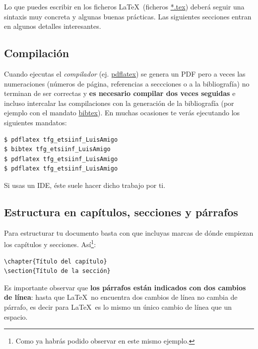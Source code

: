 Lo que puedes escribir en los ficheros \LaTeX\ (ficheros \url{*.tex})
deberá seguir una sintaxis muy concreta y algunas buenas
prácticas. Las siguientes secciones entran en algunos detalles
interesantes.

\subsection{Compilación}

Cuando ejecutas el \emph{compilador} (ej. \url{pdflatex}) se genera un
PDF pero a veces las numeraciones (números de página, referencias a
seccciones o a la bibliografía) no terminan de ser correctas y
\textbf{es necesario compilar dos veces seguidas} e incluso intercalar
las compilaciones con la generación de la bibliografía (por ejemplo
con el mandato \url{bibtex}). En muchas ocasiones te verás ejecutando
los siguientes mandatos:

\begin{verbatim}
$ pdflatex tfg_etsiinf_LuisAmigo
$ bibtex tfg_etsiinf_LuisAmigo
$ pdflatex tfg_etsiinf_LuisAmigo
$ pdflatex tfg_etsiinf_LuisAmigo
\end{verbatim}

Si usas un IDE, éste suele hacer dicho trabajo por ti.

\subsection{Estructura en capítulos, secciones y párrafos}

Para estructurar tu documento basta con que incluyas marcas de dónde
empiezan los capítulos y secciones. Así\footnote{Como ya habrás podido
  observar en este mismo ejemplo.}:

\begin{verbatim}
\chapter{Título del capítulo}
\section{Título de la sección}
\end{verbatim}

Es importante observar que \textbf{los párrafos están indicados con
  dos cambios de línea}: hasta que \LaTeX\ no encuentra dos cambios de
línea no cambia de párrafo, es decir para \LaTeX\ es lo mismo un único
cambio de línea que un espacio.

